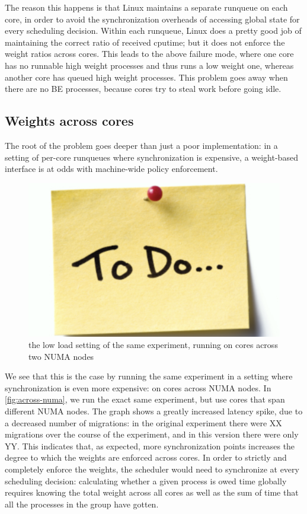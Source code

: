 The reason this happens is that Linux maintains a separate runqueue on each
core, in order to avoid the synchronization overheads of accessing global state
for every scheduling decision. Within each runqueue, Linux does a pretty good
job of maintaining the correct ratio of received cputime; but it does not
enforce the weight ratios across cores. This leads to the above failure mode,
where one core has no runnable high weight processes and thus runs a low weight
one, whereas another core has queued high weight processes. This problem goes
away when there are no BE processes, because cores try to steal work before
going idle.

\subsection{Weights across cores}

The root of the problem goes deeper than just a poor implementation: in a
setting of per-core runqueues where synchronization is expensive, a weight-based
interface is at odds with machine-wide policy enforcement.

\begin{figure}[t]
    \centering
    \includegraphics[width=0.8\columnwidth]{graphs/todo.png}
    \caption{the low load setting of the same experiment, running on cores
    across two NUMA nodes}\label{fig:across-numa}
\end{figure}

We see that this is the case by running the same experiment in a setting where
synchronization is even more expensive: on cores across NUMA nodes. In
\autoref{fig:across-numa}, we run the exact same experiment, but use cores that
span different NUMA nodes. The graph shows a greatly increased latency spike,
due to a decreased number of migrations: in the original experiment there were
XX migrations over the course of the experiment, and in this version there were
only YY. This indicates that, as expected, more synchronization points increases
the degree to which the weights are enforced across cores. In order to strictly
and completely enforce the weights, the scheduler would need to synchronize at
every scheduling decision: calculating whether a given process is owed time
globally requires knowing the total weight across all cores as well as the sum
of time that all the processes in the group have gotten. 


